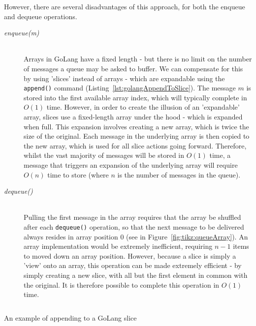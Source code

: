 However, there are several disadvantages of this approach, for both the enqueue and dequeue operations.

\begin{description}
  \item[\textit{enqueue(m)}] \hfill \\
    Arrays in GoLang have a fixed length - but there is no limit on the number
    of messages a queue may be asked to buffer. We can compensate for this by
    using 'slices' instead of arrays -
    which are expandable using the \texttt{append()} command
    (Listing~\ref{lst:golangAppendToSlice}). The message $m$ is stored into the
    first available array index, which will typically complete in $O(1)$ time.
    However, in order to create the illusion of an 'expandable' array, slices
    use a fixed-length array under the hood - which is expanded when full. This
    expansion involves creating a new array, which is twice the size of the
    original. Each message in the underlying array is then copied to the new
    array, which is used for all slice actions going forward. Therefore, whilst
    the vast majority of messages will be stored in $O(1)$ time, a message that
    triggers an expansion of the underlying array will require $O(n)$ time to
    store (where $n$ is the number of messages in the queue).
  \item[\textit{dequeue()}] \hfill \\
    Pulling the first message in the array requires that the array be shuffled
    after each \texttt{dequeue()} operation, so that the next message to
    be delivered always resides in  array position 0 (see in
    Figure~\ref{fig:tikz:queueArray}). An array implementation would be
    extremely inefficient, requiring $n - 1$ items to moved down an array
    position. However, because a slice is simply a 'view' onto an array, this
    operation can be made extremely efficient - by simply creating a new slice,
    with all but the first element in common with the original.
    It is therefore possible to complete this operation in $O(1)$ time.
\end{description}

\begin{listing}[H]
  \centering
  \inputminted[firstline=7, lastline=12]{go}{code/snippets/appendToSlice.go}
  \caption{An example of appending to a GoLang slice}
  \label{lst:golangAppendToSlice}
\end{listing}

